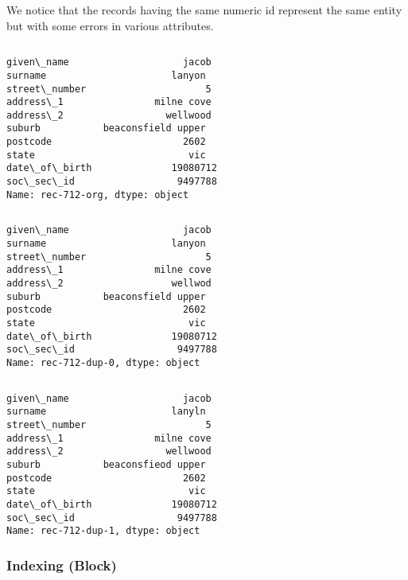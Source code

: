 \documentclass{article}
\begin{document}
    \begin{Verbatim}[commandchars=\\\{\}]

\end{Verbatim}
\begin{Verbatim}[commandchars=\\\{\}]

\end{Verbatim}
    We notice that the records having the same numeric id represent the same
entity but with some errors in various attributes.

    \begin{Verbatim}[commandchars=\\\{\}]

\end{Verbatim}
\begin{Verbatim}[commandchars=\\\{\}]
given\_name                    jacob
surname                      lanyon
street\_number                     5
address\_1                milne cove
address\_2                  wellwood
suburb           beaconsfield upper
postcode                       2602
state                           vic
date\_of\_birth              19080712
soc\_sec\_id                  9497788
Name: rec-712-org, dtype: object
\end{Verbatim}
    \begin{Verbatim}[commandchars=\\\{\}]

\end{Verbatim}
\begin{Verbatim}[commandchars=\\\{\}]
given\_name                    jacob
surname                      lanyon
street\_number                     5
address\_1                milne cove
address\_2                   wellwod
suburb           beaconsfield upper
postcode                       2602
state                           vic
date\_of\_birth              19080712
soc\_sec\_id                  9497788
Name: rec-712-dup-0, dtype: object
\end{Verbatim}
    \begin{Verbatim}[commandchars=\\\{\}]

\end{Verbatim}
\begin{Verbatim}[commandchars=\\\{\}]
given\_name                    jacob
surname                      lanyln
street\_number                     5
address\_1                milne cove
address\_2                  wellwood
suburb           beaconsfieod upper
postcode                       2602
state                           vic
date\_of\_birth              19080712
soc\_sec\_id                  9497788
Name: rec-712-dup-1, dtype: object
\end{Verbatim}
    \hypertarget{indexing-block}{%
\subsubsection{Indexing (Block)}\label{indexing-block}}
\end{document}
